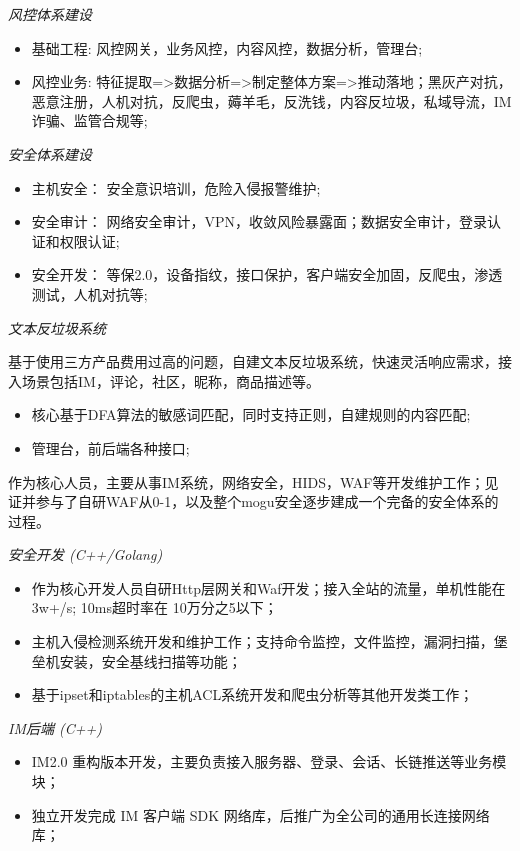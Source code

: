 \textit{风控体系建设}
\begin{itemize}
  \item 基础工程: 风控网关，业务风控，内容风控，数据分析，管理台;
  \item 风控业务: 特征提取=>数据分析=>制定整体方案=>推动落地；黑灰产对抗，恶意注册，人机对抗，反爬虫，薅羊毛，反洗钱，内容反垃圾，私域导流，IM诈骗、监管合规等;
\end{itemize}

\textit{安全体系建设}
\begin{itemize}
  \item 主机安全： 安全意识培训，危险入侵报警维护;
  \item 安全审计： 网络安全审计，VPN，收敛风险暴露面；数据安全审计，登录认证和权限认证;
  \item 安全开发： 等保2.0，设备指纹，接口保护，客户端安全加固，反爬虫，渗透测试，人机对抗等;
\end{itemize}

\textit{文本反垃圾系统}

基于使用三方产品费用过高的问题，自建文本反垃圾系统，快速灵活响应需求，接入场景包括IM，评论，社区，昵称，商品描述等。
\begin{itemize}
    \item 核心基于DFA算法的敏感词匹配，同时支持正则，自建规则的内容匹配;
    \item 管理台，前后端各种接口;
\end{itemize}

\vspace{0.2cm}
作为核心人员，主要从事IM系统，网络安全，HIDS，WAF等开发维护工作；见证并参与了自研WAF从0-1，以及整个mogu安全逐步建成一个完备的安全体系的过程。

\vspace{0.2cm}
\textit{安全开发 (C++/Golang)}
\begin{itemize}
    \item 作为核心开发人员自研Http层网关和Waf开发；接入全站的流量，单机性能在3w+/s; 10ms超时率在 10万分之5以下；
    \item 主机入侵检测系统开发和维护工作；支持命令监控，文件监控，漏洞扫描，堡垒机安装，安全基线扫描等功能；
    \item 基于ipset和iptables的主机ACL系统开发和爬虫分析等其他开发类工作；
\end{itemize}

\textit{IM后端 (C++)}
\begin{itemize}
\item IM2.0 重构版本开发，主要负责接入服务器、登录、会话、长链推送等业务模块；
\item 独立开发完成 IM 客户端 SDK 网络库，后推广为全公司的通用长连接网络库；
\end{itemize}

